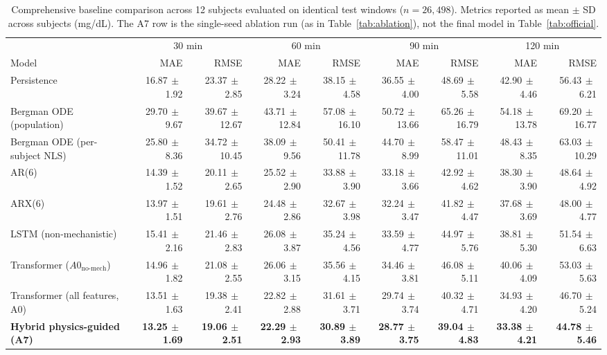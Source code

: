 \documentclass[journal]{IEEEtran}
\begin{document}
\begin{table}[t]
\centering
\caption{Comprehensive baseline comparison across 12 subjects evaluated on identical test windows ($n=26{,}498$). Metrics reported as mean $\pm$ SD across subjects (mg/dL). The A7 row is the single-seed ablation run (as in Table~\ref{tab:ablation}), not the final model in Table~\ref{tab:official}.}
\label{tab:baselines_identical}
\footnotesize
\setlength{\tabcolsep}{2.3pt}
\begin{tabular}{lrrrrrrrr}
\toprule
& \multicolumn{2}{c}{30 min} & \multicolumn{2}{c}{60 min} & \multicolumn{2}{c}{90 min} & \multicolumn{2}{c}{120 min} \\
\cmidrule(lr){2-3} \cmidrule(lr){4-5} \cmidrule(lr){6-7} \cmidrule(lr){8-9}
Model & MAE & RMSE & MAE & RMSE & MAE & RMSE & MAE & RMSE \\
\midrule
Persistence & 16.87$\,\pm\,$1.92 & 23.37$\,\pm\,$2.85 & 28.22$\,\pm\,$3.24 & 38.15$\,\pm\,$4.58 & 36.55$\,\pm\,$4.00 & 48.69$\,\pm\,$5.58 & 42.90$\,\pm\,$4.46 & 56.43$\,\pm\,$6.21 \\
Bergman ODE (population) & 29.70$\,\pm\,$9.67 & 39.67$\,\pm\,$12.67 & 43.71$\,\pm\,$12.84 & 57.08$\,\pm\,$16.10 & 50.72$\,\pm\,$13.66 & 65.26$\,\pm\,$16.79 & 54.18$\,\pm\,$13.78 & 69.20$\,\pm\,$16.77 \\
Bergman ODE (per-subject NLS) & 25.80$\,\pm\,$8.36 & 34.72$\,\pm\,$10.45 & 38.09$\,\pm\,$9.56 & 50.41$\,\pm\,$11.78 & 44.70$\,\pm\,$8.99 & 58.47$\,\pm\,$11.01 & 48.43$\,\pm\,$8.35 & 63.03$\,\pm\,$10.29 \\
AR(6) & 14.39$\,\pm\,$1.52 & 20.11$\,\pm\,$2.65 & 25.52$\,\pm\,$2.90 & 33.88$\,\pm\,$3.90 & 33.18$\,\pm\,$3.66 & 42.92$\,\pm\,$4.62 & 38.30$\,\pm\,$3.90 & 48.64$\,\pm\,$4.92 \\
ARX(6) & 13.97$\,\pm\,$1.51 & 19.61$\,\pm\,$2.76 & 24.48$\,\pm\,$2.86 & 32.67$\,\pm\,$3.98 & 32.24$\,\pm\,$3.47 & 41.82$\,\pm\,$4.47 & 37.68$\,\pm\,$3.69 & 48.00$\,\pm\,$4.77 \\
LSTM (non-mechanistic) & 15.41$\,\pm\,$2.16 & 21.46$\,\pm\,$2.83 & 26.08$\,\pm\,$3.87 & 35.24$\,\pm\,$4.56 & 33.59$\,\pm\,$4.77 & 44.97$\,\pm\,$5.76 & 38.81$\,\pm\,$5.30 & 51.54$\,\pm\,$6.63 \\
Transformer ($A0_{\text{no-mech}}$) & 14.96$\,\pm\,$1.82 & 21.08$\,\pm\,$2.55 & 26.06$\,\pm\,$3.15 & 35.56$\,\pm\,$4.15 & 34.46$\,\pm\,$3.81 & 46.08$\,\pm\,$5.11 & 40.06$\,\pm\,$4.09 & 53.03$\,\pm\,$5.63 \\
Transformer (all features, A0) & 13.51$\,\pm\,$1.63 & 19.38$\,\pm\,$2.41 & 22.82$\,\pm\,$2.88 & 31.61$\,\pm\,$3.71 & 29.74$\,\pm\,$3.74 & 40.32$\,\pm\,$4.71 & 34.93$\,\pm\,$4.20 & 46.70$\,\pm\,$5.24 \\
\textbf{Hybrid physics-guided (A7)} & \textbf{13.25$\,\pm\,$1.69} & \textbf{19.06$\,\pm\,$2.51} & \textbf{22.29$\,\pm\,$2.93} & \textbf{30.89$\,\pm\,$3.89} & \textbf{28.77$\,\pm\,$3.75} & \textbf{39.04$\,\pm\,$4.83} & \textbf{33.38$\,\pm\,$4.21} & \textbf{44.78$\,\pm\,$5.46} \\
\bottomrule
\end{tabular}
\end{table}
\end{document}
